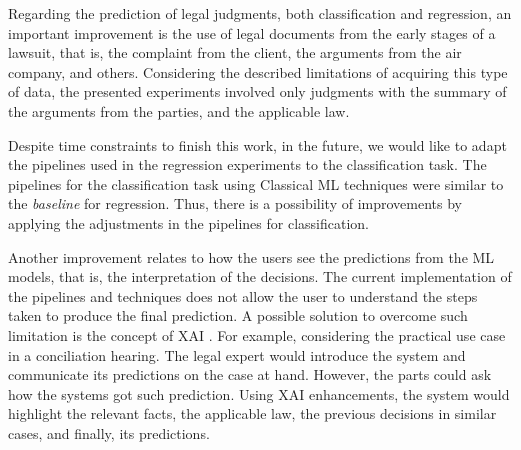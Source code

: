 Regarding the prediction of legal judgments, both classification and regression, an important  improvement is the use of legal documents from the early stages of a lawsuit, that is, the  complaint from the client, the arguments from the air company, and others. Considering the described limitations of acquiring this type of data, the presented experiments involved only judgments with the summary of the arguments from the parties, and the applicable law. 


Despite time constraints to finish this work, in the future, we would like to adapt the pipelines used in the regression experiments to the classification task. The pipelines for the classification task using Classical ML techniques  were similar to the \textit{baseline} for regression. Thus, there is a possibility of improvements by applying the adjustments in the pipelines for classification.


Another improvement relates to how the users see the predictions from the ML models, that is, the interpretation of the decisions. The current implementation of the pipelines and techniques does not allow the user to understand the steps taken to produce the final prediction. A possible solution to overcome such limitation is the concept of \gls{XAI} \cite{Tjoa2019, Bibal2020}. For example, considering the practical use case in a conciliation hearing. The legal expert would introduce the system and communicate its predictions on the case at hand. However, the parts could ask how the systems got such prediction. Using \gls{XAI} enhancements, the system would highlight the relevant facts, the applicable law, the previous decisions in similar cases, and  finally, its predictions. 

